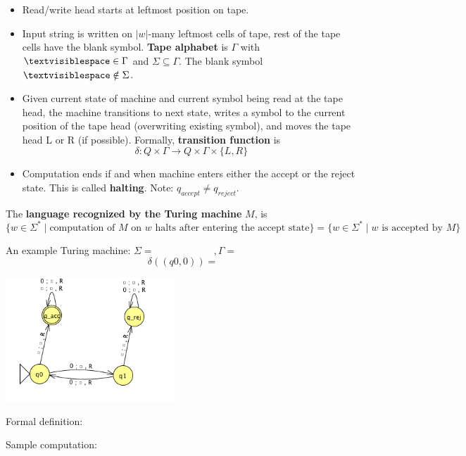 \documentclass[12pt, oneside]{article}
\begin{document}
\begin{itemize}
\setlength{\itemsep}{0pt}
\item Read/write head starts at leftmost position on tape. 
\item Input string is written on $|w|$-many leftmost cells of tape, 
rest of  the tape cells have  the blank symbol. {\bf Tape alphabet} 
is $\Gamma$ with $\textvisiblespace\in \Gamma$ and $\Sigma \subseteq \Gamma$.
The blank symbol $\textvisiblespace \notin \Sigma$.
\item Given current state of machine and current symbol being read at the tape head, 
the machine transitions to next state, writes a symbol to the current position  of the 
tape  head (overwriting existing symbol), and moves the tape head L or R (if possible). 
Formally, {\bf transition function}  is 
\[
  \delta: Q\times \Gamma \to Q \times \Gamma \times \{L, R\}
\]
\item Computation ends if and when machine enters either the accept or the reject state.
This is called {\bf halting}.
Note: $q_{accept} \neq q_{reject}$.
\end{itemize}

The {\bf language recognized by the  Turing machine} $M$,  is  
\[
  \{ w \in \Sigma^* \mid \textrm{computation of $M$ on $w$ halts after entering the accept state}\} = \{ w \in \Sigma^* \mid w \textrm{ is accepted by } M\}
\]

\newpage
An example Turing machine: $\Sigma = \phantom{\hspace{1in}}, \Gamma = \phantom{\hspace{1in}} $
\[
  \delta ( ( q0, 0)  ) =  
\]

\includegraphics[width=2.5in]{resources/machines/Lect13TM1.png}

Formal definition: 


Sample computation: 
\end{document}
